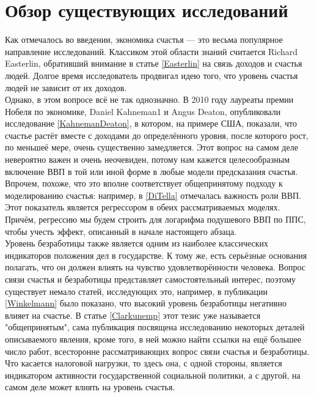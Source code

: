 \documentclass[russian]{vegareport}
\begin{document}
        \section{Обзор существующих исследований} \label{review}
        Как отмечалось во введении, экономика счастья --- это весьма популярное направление исследований. 
        Классиком этой области знаний считается Richard Easterlin, обративший внимание в статье \ref{Easterlin} 
        на связь доходов и счастья людей. Долгое время исследователь продвигал идею того, что уровень счастья людей 
        не зависит от их доходов.
        \\
        Однако, в этом вопросе всё не так однозначно. В 2010 году лауреаты премии Нобеля по экономике, 
        Daniel Kahneman1 и Angus Deaton, опубликовали исследование \ref{KahnemanDeaton}, в котором, 
        на примере США, показали, что счастье растёт вместе с доходами до определённого уровня, 
        после которого рост, по меньшеё мере, очень существенно замедляется. Этот вопрос на самом 
        деле невероятно важен и очень неочевиден, потому нам кажется целесообразным включение ВВП 
        в той или иной форме в любые модели предсказания счастья. Впрочем, похоже, что это вполне 
        соответствует общепринятому подходу к моделированию счастья: например, в \ref{DiTella} 
        отмечалась важность роли ВВП. Этот показатель является регрессором в обеих рассматриваемых моделях. 
        Причём, регрессию мы будем строить для логарифма подушевого ВВП по ППС, чтобы учесть эффект, описанный 
        в начале настоящего абзаца.
        \\
        Уровень безработицы также является одним из наиболее классических индикаторов положения дел в государстве. 
        К тому же, есть серьёзные основания полагать, что он должен влиять на чувство удовлетворённости человека. 
        Вопрос связи счастья и безработицы представляет самостоятельный интерес, поэтому существует немало статей, 
        исследующих это, например, в публикации \ref{Winkelmann} было показано, что высокий уровень безработицы 
        негативно влияет на счастье. В статье \ref{Clarkunemp} этот тезис уже называется "общепринятым", 
        сама публикация посвящена исследованию некоторых деталей описываемого явления, кроме того, в ней можно найти ссылки 
        на ещё большее число работ, всесторонне рассматривающих вопрос связи счастья и безработицы.
        \\
        Что касается налоговой нагрузки, то здесь она, с одной стороны, является индикатором активности 
        государственной социальной политики, а с другой, на самом деле может влиять на уровень счастья. 
\end{document}
